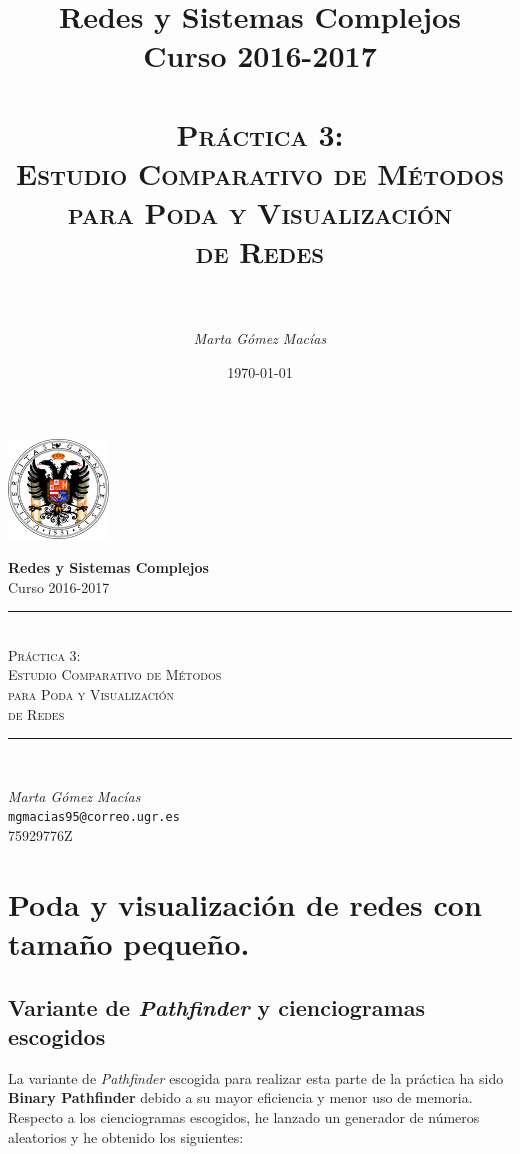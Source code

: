 \documentclass[10pt,a4paper,spanish]{article}
\title{
\normalfont \normalsize 
{\bf Redes y Sistemas Complejos} \\ Curso 2016-2017 \\ [25pt] %
\horrule{0.5pt} \\[0.4cm] %
\huge \textsc{Práctica 3: \\ Estudio Comparativo de Métodos \\ para Poda y Visualización \\ de Redes } \\ %
\horrule{2pt} \\[0.5cm] %
}
\author{\textit{Marta Gómez Macías}} %
\numberwithin{equation}{section} %
\numberwithin{figure}{section} %
\numberwithin{table}{section} %
\newcommand{\horrule}[1]{\rule{\linewidth}{#1}} %
\begin{document}
\renewcommand{\listtablename}{Índice de tablas}
\renewcommand{\tablename}{Tabla} 

\begin{titlepage}
\begin{center}
\includegraphics[width=0.2\textwidth]{../../ugr}

\normalfont \normalsize 
{\bf Redes y Sistemas Complejos} \\ Curso 2016-2017 \\ [25pt] %
\horrule{0.5pt} \\[0.4cm] %
{\huge \textsc{Práctica 3: \\ Estudio Comparativo de Métodos \\ para Poda y Visualización \\ de Redes }} %
\horrule{2pt} \\[0.5cm] %

{\Large \textit{Marta Gómez Macías} \\ \texttt{mgmacias95@correo.ugr.es} \\ 75929776Z \\[0.5cm]

\date{\today}} %
\end{center}
\end{titlepage}

\tableofcontents %



\section{Poda y visualización de redes con tamaño pequeño.}


\subsection{Variante de \textit{Pathfinder} y cienciogramas escogidos}
La variante de \textit{Pathfinder} escogida para realizar esta parte de la práctica ha sido \textbf{Binary Pathfinder} debido a su mayor eficiencia y menor uso de memoria. Respecto a los cienciogramas escogidos, he lanzado un generador de números aleatorios y he obtenido los siguientes:
\end{document}
